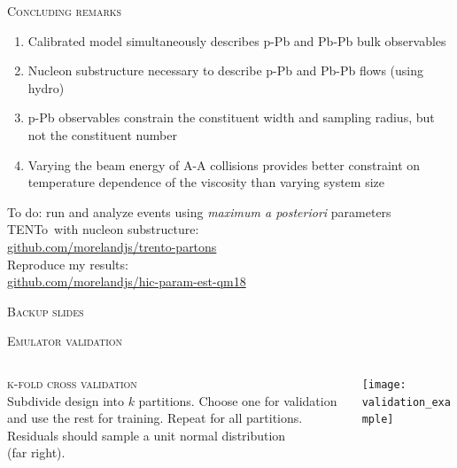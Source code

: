 \documentclass[aspectratio=169]{beamer}
\newcommand{\trento}{T\raisebox{-0.3ex}{R}ENTo}
\begin{document}
\begin{frame}{\scshape Concluding remarks}
  \vfill
  \begin{enumerate}
    \item Calibrated model simultaneously describes p-Pb and Pb-Pb bulk observables\\[.5ex]
    \item Nucleon substructure necessary to describe p-Pb and Pb-Pb flows (using hydro)\\[.5ex]
    \item p-Pb observables constrain the constituent width and sampling radius, but not the constituent number\\[.5ex]
    \item Varying the beam energy of A-A collisions provides better constraint on temperature dependence of the viscosity than varying system size
  \end{enumerate}
  \begin{flushleft}
    To do: run and analyze events using \textit{maximum a posteriori} parameters\\[2ex]
    \textcolor{theme}{\trento\ with nucleon substructure:}\\
    \url{github.com/morelandjs/trento-partons}\\[1ex]
    \textcolor{theme}{Reproduce my results:}\\
    \url{github.com/morelandjs/hic-param-est-qm18}
  \end{flushleft}
\end{frame}

\appendix


\begin{frame}
  \begin{center}
    \Large \scshape Backup slides
  \end{center}
\end{frame}


\begin{frame}{\scshape Emulator validation}
  \begin{columns}
    \begin{column}{.35\textwidth}
      \textcolor{theme}{\scshape k-fold cross validation}\\[.5ex]
      Subdivide design into $k$ partitions. Choose one for validation and use the
      rest for training. Repeat for all partitions.\\[2ex]
      Residuals should sample a unit normal distribution\\
      (far right).
    \end{column}
    \begin{column}{.65\textwidth}
      \texttt{[image: validation\_example]}
    \end{column}
  \end{columns}
\end{frame}
\end{document}
